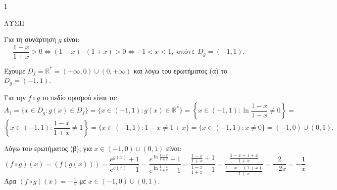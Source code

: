 \begin{ylh}{1}
    \item [Ύλη από εικόνα]
\end{ylh}
ΛΥΣΗ
\begin{alist}
\item Για τη συνάρτηση $g$ είναι:
    \[ \frac{1-x}{1+x} > 0 \Leftrightarrow (1-x)\cdot(1+x) > 0 \Leftrightarrow -1 < x < 1, \text{ οπότε } D_g = (-1,1). \]
\item Έχουμε $D_f = \mathbb{R}^* = (-\infty,0) \cup (0,+\infty)$ και λόγω του ερωτήματος (α) το $D_g = (-1,1)$.

    Για την $f \circ g$ το πεδίο ορισμού είναι το:
    \[ A_1 = \{x \in D_g : g(x) \in D_f \} = \{x \in (-1,1): g(x) \in \mathbb{R}^* \} = \left\{x \in (-1,1):\ln \frac{1-x}{1+x} \ne 0\right\} = \]
    \[ \left\{x \in (-1,1):\frac{1-x}{1+x} \ne 1\right\} = \{x \in (-1,1):1-x \ne 1+x\} = \{x \in (-1,1): x \ne 0\} = (-1,0) \cup (0,1). \]
\item Λόγω του ερωτήματος (β), για $x \in (-1,0) \cup (0,1)$ είναι:
    \[ (f \circ g)(x)=(f(g(x))) = \frac{e^{g(x)}+1}{e^{g(x)}-1} = \frac{e^{\ln \frac{1-x}{1+x}}+1}{e^{\ln \frac{1-x}{1+x}}-1} = \frac{\frac{1-x}{1+x}+1}{\frac{1-x}{1+x}-1} = \frac{\frac{1-x+1+x}{1+x}}{\frac{1-x-(1+x)}{1+x}} = \frac{2}{-2x} = -\frac{1}{x}. \]
    Άρα $(f \circ g)(x) = -\frac{1}{x}$ με $x \in (-1,0) \cup (0,1)$.
\end{alist}